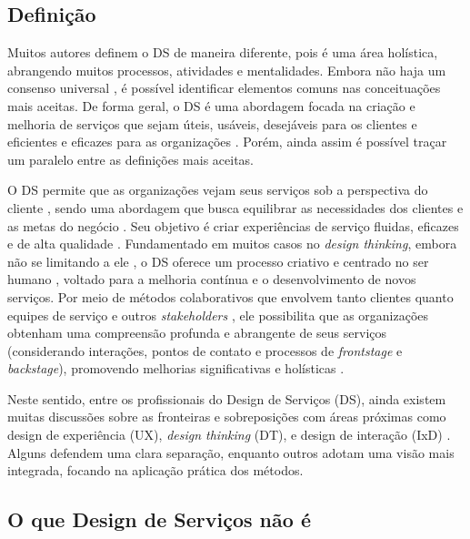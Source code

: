 \subsection{Definição}

Muitos autores definem o DS de maneira diferente, pois é uma área holística, abrangendo muitos processos, atividades e mentalidades. Embora não haja um consenso universal \cite{ZomerdijkVoss2010}, é possível identificar elementos comuns nas conceituações mais aceitas. De forma geral, o DS é uma abordagem focada na criação e melhoria de serviços que sejam úteis, usáveis, desejáveis para os clientes e eficientes e eficazes para as organizações \cite{Mager2009Emerging}. Porém, ainda assim é possível traçar um paralelo entre as definições mais aceitas.

O DS permite que as organizações vejam seus serviços sob a perspectiva do cliente \cite{Polaine2013Orange, Mager2009Emerging}, sendo uma abordagem que busca equilibrar as necessidades dos clientes e as metas do negócio \cite{Stickdorn2019, iriarte2023service}. Seu objetivo é criar experiências de serviço fluidas, eficazes e de alta qualidade \cite{Mager2009Emerging, Norman2016Applying}. Fundamentado em muitos casos no \textit{design thinking}, embora não se limitando a ele \cite{lee2022how}, o DS oferece um processo criativo e centrado no ser humano \cite{Norman2016Applying, mager2023product}, voltado para a melhoria contínua e o desenvolvimento de novos serviços. Por meio de métodos colaborativos que envolvem tanto clientes quanto equipes de serviço e outros \textit{stakeholders} \cite{milton2021eatingdisorders}, ele possibilita que as organizações obtenham uma compreensão profunda e abrangente de seus serviços (considerando interações, pontos de contato e processos de \textit{frontstage} e \textit{backstage}), promovendo melhorias significativas e holísticas \cite{Stickdorn2019, Tolle2024Vink}.

Neste sentido, entre os profissionais do Design de Serviços (DS), ainda existem muitas discussões sobre as fronteiras e sobreposições com áreas próximas como design de experiência (UX), \textit{design thinking} (DT), e design de interação (IxD) \cite{lee2022how}. Alguns defendem uma clara separação, enquanto outros adotam uma visão mais integrada, focando na aplicação prática dos métodos.

\subsection{O que Design de Serviços não é}

